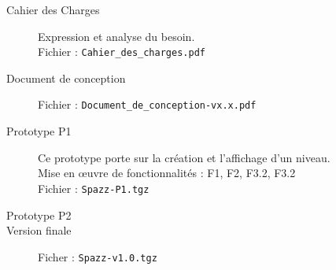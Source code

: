 \documentclass[a4paper,11pt]{article}
\begin{document}
\begin{description}
	\item [Cahier des Charges]	Expression et analyse du besoin.\\
								Fichier : \texttt{Cahier\_des\_charges.pdf}
	\item [Document de conception] Fichier : \texttt{Document\_de\_conception-vx.x.pdf}
	\item [Prototype P1] 	Ce prototype porte sur la création et l'affichage d'un niveau.\\
							Mise en œuvre de fonctionnalités : F1, F2, F3.2, F3.2\\
							Fichier : \texttt{Spazz-P1.tgz}
	\item [Prototype P2]
	\item [Version finale] Ficher : \texttt{Spazz-v1.0.tgz}
\end{description}
\end{document}
